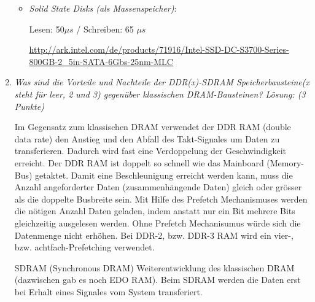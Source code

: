 \documentclass[10pt]{article}
\begin{document}
\begin{enumerate}[label=\alph*)]
\begin{itemize}
			
			\item \textit{Solid State Disks (als Massenspeicher)}:
			
			Lesen: 50$\mu s$ / Schreiben: 65 $\mu s$ 
			
			\url{http://ark.intel.com/de/products/71916/Intel-SSD-DC-S3700-Series-800GB-2_5in-SATA-6Gbs-25nm-MLC}
		\end{itemize}
		\item 
			\textit{Was sind die Vorteile und Nachteile der DDR(x)-SDRAM Speicherbausteine(x steht für leer, 2 und 3) gegenüber klassischen DRAM-Bausteinen? Lösung: (3 Punkte)}
		
		Im Gegensatz zum klassischen DRAM verwendet der DDR RAM (double data rate) den Anstieg und den Abfall des Takt-Signales um Daten zu transferieren. Dadurch wird fast eine Verdoppelung der Geschwindigkeit erreicht. Der DDR RAM ist doppelt so schnell wie das Mainboard (Memory-Bus) getaktet. Damit eine Beschleunigung erreicht werden kann, muss die Anzahl angeforderter Daten (zusammenhängende Daten) gleich oder grösser als die doppelte Busbreite sein. 
		Mit Hilfe des Prefetch Mechanismuses werden die nötigen Anzahl Daten geladen, indem anstatt nur ein Bit mehrere Bits gleichzeitig ausgelesen werden. Ohne Prefetch Mechanisumus würde sich die Datenmenge nicht erhöhen. Bei DDR-2, bzw. DDR-3 RAM wird ein vier-, bzw. achtfach-Prefetching verwendet. 

		SDRAM (Synchronous DRAM) Weiterentwicklung des klassischen DRAM (dazwischen gab es noch EDO RAM). Beim SDRAM werden die Daten erst bei Erhalt eines Signales vom System transferiert. 
		
\end{enumerate}

\newpage

\end{document}
